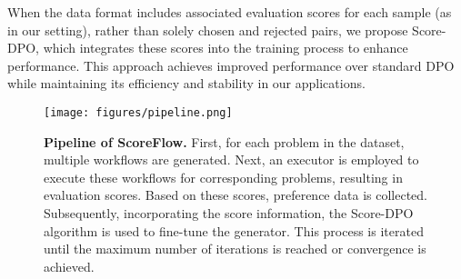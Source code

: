 When the data format includes associated evaluation scores for each sample (as in our setting), rather than solely chosen and rejected pairs, we propose Score-DPO, which integrates these scores into the training process to enhance performance. This approach achieves improved performance over standard DPO while maintaining its efficiency and stability in our applications.



\begin{figure*}[tp]
    \centering
    \texttt{[image: figures/pipeline.png]}
    \caption{\textbf{Pipeline of ScoreFlow.} First, for each problem in the dataset, multiple workflows are generated. Next, an executor is employed to execute these workflows for corresponding problems, resulting in evaluation scores. Based on these scores, preference data is collected. Subsequently, incorporating the score information, the Score-DPO algorithm is used to fine-tune the generator. This process is iterated until the maximum number of iterations is reached or convergence is achieved. }
    \label{pipline}
\vspace{-3mm}
\end{figure*}